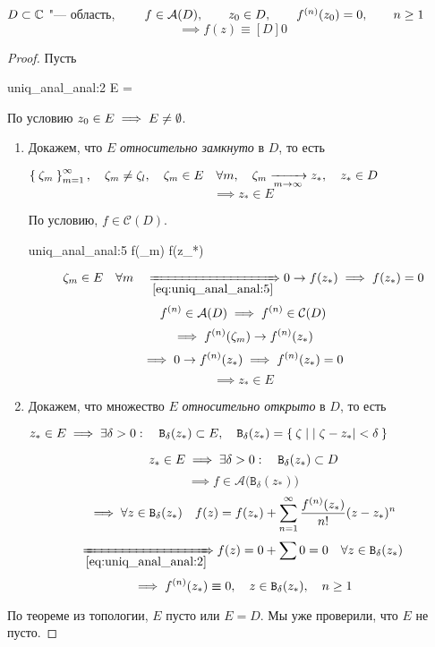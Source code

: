 \begin{theorem}
	$ D \subset \mathbb{C} $ "--- область, $ \qquad f \in \mathcal A(D), \qquad z_0 \in D, \qquad {f}^{({n})}(z_0) = 0, \qquad n \ge 1 $
	$$ \implies f(z) \equiv[D] 0 $$
\end{theorem}

\begin{proof}
	Пусть
	\begin{equ}{uniq_anal_anal:2}
		E = 
	\end{equ}
	По условию $ z_0 \in E \implies E \ne \emptyset $.

	\begin{enumerate}
		\item Докажем, что $ E $ \emph{относительно замкнуто} в $ D $, то есть
			\begin{statement}
				$ \Set{\zeta_m}_{m=1}^{\infty}, \quad \zeta_m \ne \zeta_l, \quad \zeta_m \in E \quad \forall m, \quad \zeta_m \xrightarrow[m \to \infty]{} z_*, \quad z_* \in D $
				$$ \implies z_* \in E $$
			\end{statement}

			По условию, $ f \in \mathcal C(D) $.
			\begin{equ}{uniq_anal_anal:5}
				 f(\zeta_m) \to f(z_*)
			\end{equ}
			$$ \zeta_m \in E \quad \forall m \quad \underimp{\eref{uniq_anal_anal:5}} 0 \to f(z_*) \implies f(z_*) = 0 $$
			$$ {f}^{({n})} \in \mathcal A(D) \implies {f}^{({n})} \in \mathcal C(D) $$
			$$ \implies {f}^{({n})}(\zeta_m) \to {f}^{({n})}(z_*) $$
			$$ \implies 0 \to {f}^{({n})}(z_*) \implies {f}^{({n})}(z_*) = 0 $$
			$$ \implies z_* \in E $$

		\item Докажем, что множество $ E $ \emph{относительно открыто} в $ D $, то есть
			\begin{statement}
				$ z_* \in E \implies \exists \delta > 0 : \quad \mathtt B_\delta (z_*) \subset E, \quad \mathtt B_\delta (z_*) = \Set{\zeta \mid |\zeta - z_*| < \delta} $
			\end{statement}
			$$ z_* \in E \implies \exists \delta > 0 : \quad \mathtt B_\delta(z_*) \subset D $$
			$$ \implies f \in \mathcal A \big( \mathtt B_\delta(z_*) \big) $$
			$$ \implies \forall z \in \mathtt B_\delta (z_*) \quad f(z) = f(z_*) + \sum_{n = 1}^\infty \frac{{f}^{({n})}(z_*)}{n!} (z - z_*)^n $$
			$$ \underimp{\eref{uniq_anal_anal:2}} f(z) = 0 + \sum 0 = 0 \quad \forall z \in \mathtt B_\delta (z_*) $$
		$$ \implies \nder f(z_*) \equiv 0, \quad z \in \mathtt B_\delta (z_*), \quad n \ge 1 $$
	\end{enumerate}
	По теореме из топологии, $ E $ пусто или $ E = D $. Мы уже проверили, что $ E $ не пусто.
\end{proof}

